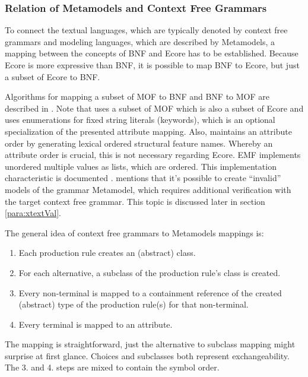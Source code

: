 

\subsubsection{Relation of Metamodels and Context Free Grammars} \label{sec:MM:CFGs}
To connect the textual languages, which are typically denoted by context free grammars and modeling languages, which are described by Metamodels, a mapping between the concepts of BNF and Ecore has to be established. Because Ecore is more expressive than BNF, it is possible to map BNF to Ecore, but just a subset of Ecore to BNF.

Algorithms for mapping a subset of MOF to BNF and BNF to MOF are described in \cite{MofCfg}. Note that \cite{MofCfg} uses a subset of MOF which is also a subset of Ecore and uses enumerations for fixed string literals (keywords), which is an optional specialization of the presented attribute mapping. Also,  \cite{MofCfg} maintains an attribute order by generating lexical ordered structural feature names. Whereby an attribute order is crucial, this is not necessary regarding Ecore. EMF implements unordered multiple values as lists, which are ordered. This implementation characteristic is documented \cite{EMF2nd}.  \cite{MofCfg} mentions that it's possible to create ``invalid'' models of the grammar Metamodel, which requires additional verification with the target context free grammar. This topic is discussed later in section \ref{para:xtextVal}.

The general idea of context free grammars to Metamodels mappings is:
\begin{enumerate}
	\item Each production rule creates an (abstract) class.
	\item For each alternative,  a subclass of the production rule's class is created.
	\item Every non-terminal is mapped to a containment reference of the created (abstract) type of the production rule(s) for that non-terminal.
	\item Every terminal is mapped to an attribute.
\end{enumerate}

The mapping is straightforward, just the alternative to subclass mapping might surprise at first glance. Choices and subclasses both represent exchangeability. The 3. and 4. steps are mixed to contain the symbol order.

